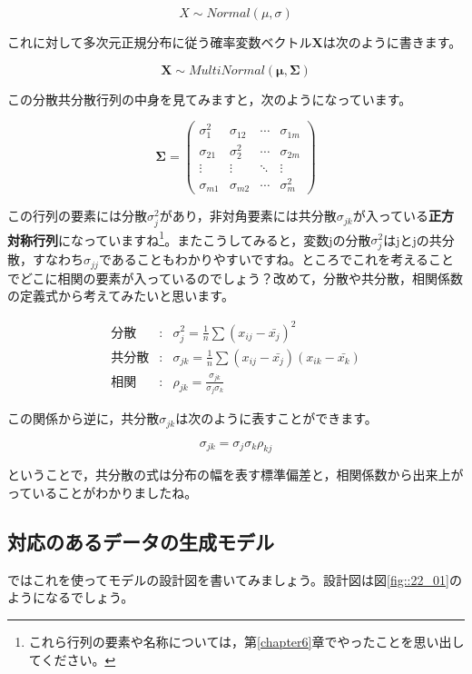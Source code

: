 \documentclass{ltjsbook}
\begin{document}
\[ X \sim Normal(\mu, \sigma) \]

これに対して多次元正規分布に従う確率変数ベクトル$\bm{X}$は次のように書きます。

\[ \bm{X} \sim MultiNormal(\bm{\mu}, \bm{\Sigma}) \]

この分散共分散行列の中身を見てみますと，次のようになっています。

\[ \bm{\Sigma} = \begin{pmatrix} \sigma_{1}^2 & \sigma_{12} & \cdots & \sigma_{1m} \\
                                \sigma_{21} & \sigma_2^2 & \cdots & \sigma_{2m} \\
                                \vdots & \vdots & \ddots & \vdots \\
                                \sigma_{m1} & \sigma_{m2} & \cdots & \sigma_{m}^2 \end{pmatrix} \]

この行列の要素には分散$\sigma_j^2$があり，非対角要素には共分散$\sigma_{jk}$が入っている\textbf{正方対称行列}になっていますね\footnote{これら行列の要素や名称については，第\ref{chapter6}章でやったことを思い出してください。}。またこうしてみると，変数jの分散$\sigma_j^2$はjとjの共分散，すなわち$\sigma_{jj}$であることもわかりやすいですね。ところでこれを考えることでどこに相関の要素が入っているのでしょう？改めて，分散や共分散，相関係数の定義式から考えてみたいと思います。

\begin{eqnarray}
    \mbox{分散} &:& \sigma_{j}^2 = \frac{1}{n}\sum (x_{ij} -\bar{x_j})^2 \\
    \mbox{共分散} &:& \sigma_{jk} = \frac{1}{n}\sum (x_{ij} - \bar{x_j})(x_{ik} - \bar{x_k}) \\
    \mbox{相関} &:& \rho_{jk} = \frac{\sigma_{jk}}{\sigma_j\sigma_k} 
\end{eqnarray}

この関係から逆に，共分散$\sigma_{jk}$は次のように表すことができます。

\[ \sigma_{jk} = \sigma_j \sigma_k \rho_{kj} \]

ということで，共分散の式は分布の幅を表す標準偏差と，相関係数から出来上がっていることがわかりましたね。
\subsection{対応のあるデータの生成モデル}
ではこれを使ってモデルの設計図を書いてみましょう。設計図は図\ref{fig::22_01}のようになるでしょう。
\end{document}
